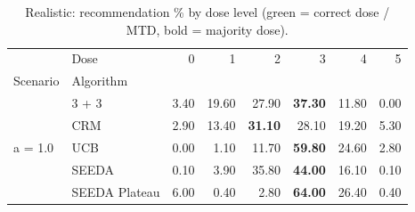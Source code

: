 \begin{table}[H]
\centering
\caption{Realistic: recommendation \% by dose level (green = correct dose / MTD, bold = majority dose).}
\label{tab:real_rec_by_dose}
\begin{tabular}{llrrrrrr}
\toprule
 & Dose & 0 & 1 & 2 & 3 & 4 & 5 \\
Scenario & Algorithm &  &  &  &  &  &  \\
\midrule
\multirow[c]{5}{*}{a = 1.0} & 3 + 3 & 3.40 & 19.60 & {\cellcolor[HTML]{C8E6C9}} 27.90 & \bfseries 37.30 & 11.80 & 0.00 \\
 & CRM & 2.90 & 13.40 & {\cellcolor[HTML]{C8E6C9}} \bfseries 31.10 & 28.10 & 19.20 & 5.30 \\
 & UCB & 0.00 & 1.10 & {\cellcolor[HTML]{C8E6C9}} 11.70 & \bfseries 59.80 & 24.60 & 2.80 \\
 & SEEDA & 0.10 & 3.90 & {\cellcolor[HTML]{C8E6C9}} 35.80 & \bfseries 44.00 & 16.10 & 0.10 \\
 & SEEDA Plateau & 6.00 & 0.40 & {\cellcolor[HTML]{C8E6C9}} 2.80 & \bfseries 64.00 & 26.40 & 0.40 \\
\bottomrule
\end{tabular}
\end{table}
